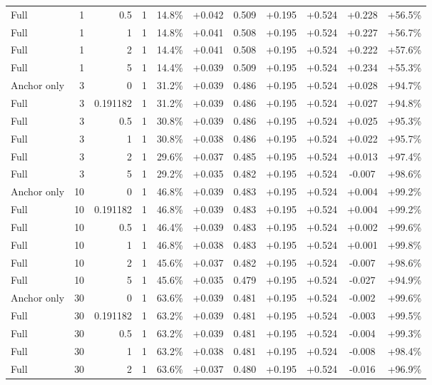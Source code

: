 \begin{table}[htbp]
\begin{tabular}{lrrrccccccc}
Full & 1 & 0.5 & 1 & 14.8\% & +0.042 & 0.509 & +0.195 & +0.524 & +0.228 & +56.5\% \\
Full & 1 & 1 & 1 & 14.8\% & +0.041 & 0.508 & +0.195 & +0.524 & +0.227 & +56.7\% \\
Full & 1 & 2 & 1 & 14.4\% & +0.041 & 0.508 & +0.195 & +0.524 & +0.222 & +57.6\% \\
Full & 1 & 5 & 1 & 14.4\% & +0.039 & 0.509 & +0.195 & +0.524 & +0.234 & +55.3\% \\
Anchor only & 3 & 0 & 1 & 31.2\% & +0.039 & 0.486 & +0.195 & +0.524 & +0.028 & +94.7\% \\
Full & 3 & 0.191182 & 1 & 31.2\% & +0.039 & 0.486 & +0.195 & +0.524 & +0.027 & +94.8\% \\
Full & 3 & 0.5 & 1 & 30.8\% & +0.039 & 0.486 & +0.195 & +0.524 & +0.025 & +95.3\% \\
Full & 3 & 1 & 1 & 30.8\% & +0.038 & 0.486 & +0.195 & +0.524 & +0.022 & +95.7\% \\
Full & 3 & 2 & 1 & 29.6\% & +0.037 & 0.485 & +0.195 & +0.524 & +0.013 & +97.4\% \\
Full & 3 & 5 & 1 & 29.2\% & +0.035 & 0.482 & +0.195 & +0.524 & -0.007 & +98.6\% \\
Anchor only & 10 & 0 & 1 & 46.8\% & +0.039 & 0.483 & +0.195 & +0.524 & +0.004 & +99.2\% \\
Full & 10 & 0.191182 & 1 & 46.8\% & +0.039 & 0.483 & +0.195 & +0.524 & +0.004 & +99.2\% \\
Full & 10 & 0.5 & 1 & 46.4\% & +0.039 & 0.483 & +0.195 & +0.524 & +0.002 & +99.6\% \\
Full & 10 & 1 & 1 & 46.8\% & +0.038 & 0.483 & +0.195 & +0.524 & +0.001 & +99.8\% \\
Full & 10 & 2 & 1 & 45.6\% & +0.037 & 0.482 & +0.195 & +0.524 & -0.007 & +98.6\% \\
Full & 10 & 5 & 1 & 45.6\% & +0.035 & 0.479 & +0.195 & +0.524 & -0.027 & +94.9\% \\
Anchor only & 30 & 0 & 1 & 63.6\% & +0.039 & 0.481 & +0.195 & +0.524 & -0.002 & +99.6\% \\
Full & 30 & 0.191182 & 1 & 63.2\% & +0.039 & 0.481 & +0.195 & +0.524 & -0.003 & +99.5\% \\
Full & 30 & 0.5 & 1 & 63.2\% & +0.039 & 0.481 & +0.195 & +0.524 & -0.004 & +99.3\% \\
Full & 30 & 1 & 1 & 63.2\% & +0.038 & 0.481 & +0.195 & +0.524 & -0.008 & +98.4\% \\
Full & 30 & 2 & 1 & 63.6\% & +0.037 & 0.480 & +0.195 & +0.524 & -0.016 & +96.9\% \\

\end{tabular}
\end{table}
